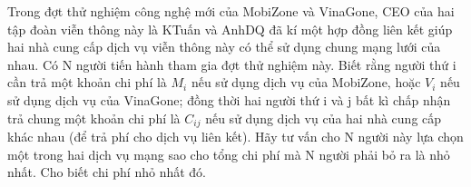 Trong đợt thử nghiệm công nghệ mới của MobiZone và VinaGone, CEO của hai tập đoàn viễn thông này là KTuấn và AnhDQ đã kí một hợp đồng liên kết giúp hai nhà cung cấp dịch vụ viễn thông này có thể sử dụng chung mạng lưới của nhau. Có N người tiến hành tham gia đợt thử nghiệm này. Biết rằng người thứ i cần trả một khoản chi phí là $M_{i}$   nếu sử dụng dịch vụ của MobiZone, hoặc $V_{i}$   nếu sử dụng dịch vụ của VinaGone; đồng thời hai người thứ i và j bất kì chấp nhận trả chung một khoản chi phí là $C_{ij}$   nếu sử dụng dịch vụ của hai nhà cung cấp khác nhau (để trả phí cho dịch vụ liên kết).
Hãy tư vấn cho N người này lựa chọn một trong hai dịch vụ mạng sao cho tổng chi phí mà N người phải bỏ ra là nhỏ nhất. Cho biết chi phí nhỏ nhất đó.